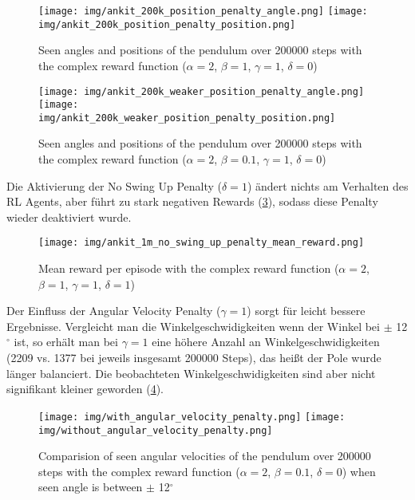 \begin{figure}[htbp]
    \centering
    \texttt{[image: img/ankit\_200k\_position\_penalty\_angle.png]}
    \texttt{[image: img/ankit\_200k\_position\_penalty\_position.png]}
    \caption{Seen angles and positions of the pendulum over 200000 steps with the complex reward function ($\alpha=2$, $\beta=1$, $\gamma=1$, $\delta=0$)}
    \label{fig:angle_position_ankit_200k_position_penalty}
\end{figure}
\begin{figure}[htbp]
    \centering
    \texttt{[image: img/ankit\_200k\_weaker\_position\_penalty\_angle.png]}
    \texttt{[image: img/ankit\_200k\_weaker\_position\_penalty\_position.png]}
    \caption{Seen angles and positions of the pendulum over 200000 steps with the complex reward function ($\alpha=2$, $\beta=0.1$, $\gamma=1$, $\delta=0$)}
    \label{fig:angle_position_ankit_200k_weaker_position_penalty}
\end{figure}
Die Aktivierung der No Swing Up Penalty ($\delta=1$) ändert nichts am Verhalten des RL Agents, aber führt zu stark negativen Rewards (\ref{fig:mean_reward_ankit_1m_no_swing_up_penalty}), sodass diese Penalty wieder deaktiviert wurde.
\begin{figure}[htbp]
    \centering
    \texttt{[image: img/ankit\_1m\_no\_swing\_up\_penalty\_mean\_reward.png]}
    \caption{Mean reward per episode with the complex reward function ($\alpha=2$, $\beta=1$, $\gamma=1$, $\delta=1$)}
    \label{fig:mean_reward_ankit_1m_no_swing_up_penalty}
\end{figure}
Der Einfluss der Angular Velocity Penalty ($\gamma=1$) sorgt für leicht bessere Ergebnisse. Vergleicht man die Winkelgeschwidigkeiten wenn der Winkel bei $\pm$ 12$^\circ$ ist, so erhält man bei $\gamma=1$ eine höhere Anzahl an Winkelgeschwidigkeiten (2209 vs. 1377 bei jeweils insgesamt 200000 Steps), das heißt der Pole wurde länger balanciert. Die beobachteten Winkelgeschwidigkeiten sind aber nicht signifikant kleiner geworden (\ref{fig:filtered_angular_velocity_ankit_200k_compare_angular_velocity_penalty}).
\begin{figure}[htbp]
    \centering
    \texttt{[image: img/with\_angular\_velocity\_penalty.png]}
    \texttt{[image: img/without\_angular\_velocity\_penalty.png]}
    \caption{Comparision of seen angular velocities of the pendulum over 200000 steps with the complex reward function ($\alpha=2$, $\beta=0.1$, $\delta=0$) when seen angle is between $\pm$ 12$^\circ$}
    \label{fig:filtered_angular_velocity_ankit_200k_compare_angular_velocity_penalty}
\end{figure}
